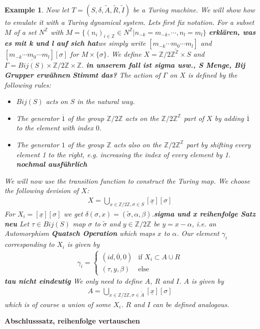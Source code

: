 \documentclass[12pt,a4paper]{scrartcl}
\newtheorem{Example}[Theorem]{Example}
\numberwithin{equation}{section}
\newcommand{\Z}{\mathbb{Z}} %
\newcommand{\2}{\mathbb{Z} / 2 \mathbb{Z}}
\newcommand{\1}{\overline{1}}
\newcommand{\0}{\overline{0}}
\begin{document}
\begin{Example}\label{TMtoTDS}
	Now let  $T=(S,\delta, \tilde{A}, \tilde{R}, \tilde{I})$ be a Turing machine. We will show how to emulate it with a Turing dynamical system. Lets first fix notation. For a subset $M$ of a set $N^\Z$ with $M = \{(n_i)_{i \in \Z} \in N^\Z | n_{-k} = m_{-k}, \cdots, n_l = m_l \}$ \textbf{erklären, was es mit k und l auf sich hat}we simply write $[m_{-k} \cdots \underline{m_0} \cdots m_l]$ and $[m_{-k} \cdots \underline{m_0} \cdots m_l][\sigma]$ for $M \times \{\sigma\}$. We define $X = \2^\Z \times S$ and $\Gamma = Bij(S) \times \2 \times \Z$. \textbf{in unserem fall ist sigma usw., S Menge, Bij Grupper erwähnen}
	\textbf{Stimmt das?}
	The action of $\Gamma$ on $X$ is defined by the following rules:
	\begin{itemize}
		\item $Bij(S)$ acts on $S$ in the natural way.
		\item The generator $\overline{1}$ of the group $\Z / 2\Z$ acts on the $\Z / 2\Z^\Z$ part of $X$ by adding $\overline{1}$ to the element with index $0$.
		\item The generator $1$ of the group $\Z$ acts also on the $\Z / 2\Z^\Z$ part by shifting every element 1 to the right, e.g. increasing the index of every element by 1. \textbf{nochmal ausführlich}
	\end{itemize}
	We will now use the transition function to construct the Turing map. We choose the following devision of $X$:
	\begin{align*}
	X = \bigcup_{x \in \2, \sigma \in S} [\underline{x}][\sigma]
	\end{align*}
	For $X_i = [\underline{x}][\sigma]$ we get $\delta(\sigma, x) = (\tilde{\sigma}, \alpha, \beta)$.\textbf{sigma und x reihenfolge Satz neu} Let $\tau \in Bij(S)$ map $\sigma$ to $\tilde{\sigma}$ and $y \in \2$ be $y=x-\alpha$, i.e. an Automorphism \textbf{Quatsch Operation} which maps $x$ to $\alpha$. Our element $\gamma_i$ corresponding to $X_i$ is given by 
	\begin{align*}
	\gamma_i = \begin{cases}
	(id, \overline{0}, 0) & \text{if } X_i \subset A \cup R \\
	(\tau, y, \beta) & \text{else}
	\end{cases}
	\end{align*} 
	\textbf{tau nicht eindeutig}
	We only need to define $A$, $R$ and $I$. $A$ is given by
	\begin{align*}
	A = \bigcup_{x \in \2, \sigma \in \tilde{A}}[\underline{x}][\sigma]
	\end{align*}
	which is of course a union of some $X_i$. $R$ and $I$ can be defined analogous.
\end{Example} \textbf{Abschlusssatz, reihenfolge vertauschen}
\end{document}
